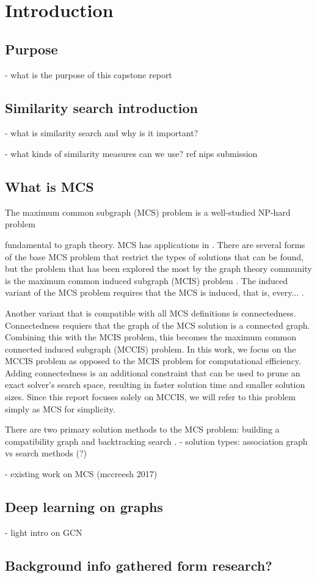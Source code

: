 \section{Introduction}
\subsection{Purpose}
- what is the purpose of this capstone report
\subsection{Similarity search introduction}
- what is similarity search and why is it important?



- what kinds of similarity measures can we use? ref nips submission
\subsection{What is MCS}
The maximum common subgraph (MCS) problem is a well-studied NP-hard problem 



fundamental to graph theory. MCS has applications in . There are several forms of the base MCS problem that restrict the types of solutions that can be found, but the problem that has been explored the most by the graph theory community is the maximum common induced subgraph (MCIS) problem \cite{vismara2008finding}. The induced variant of the MCS problem requires that the MCS is induced, that is, every... . 

Another variant that is compatible with all MCS definitions is connectedness. Connectedness requiers that the graph of the MCS solution is a connected graph. Combining this with the MCIS problem, this becomes the maximum common connected induced subgraph (MCCIS) problem. In this work, we focus on the MCCIS problem as opposed to the MCIS problem for computational efficiency. Adding connectedness is an additional constraint that can be used to prune an exact solver's search space, resulting in faster solution time and smaller solution sizes. Since this report focuses solely on MCCIS, we will refer to this problem simply as MCS for simplicity.

There are two primary solution methods to the MCS problem: building a compatibility graph  and backtracking search . 
- solution types: association graph vs search methods (?)


- existing work on MCS (mccreesh 2017)

\subsection{Deep learning on graphs}
- light intro on GCN
\subsection{Background info gathered form research?}